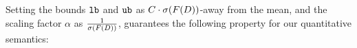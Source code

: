 %
%
%
Setting the bounds ${\mathtt{lb}}$ and ${\mathtt{ub}}$ as $C\cdot{\mathtt{\sigma}}(F(D))$-away from the mean,
and the scaling factor $\alpha$ as $\frac{1}{{\mathtt{\sigma}}(F(D))}$, guarantees the
following property for our quantitative semantics:
%
